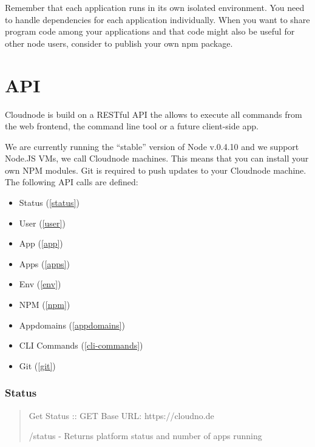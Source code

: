 Remember that each application runs in its own isolated environment. You need to handle dependencies for each application individually. When you want to share program code among your applications and that code might also be useful for other node users, consider to publish your own npm package.

\chapter{API}
\label{api}

Cloudnode is build on a RESTful API the allows to execute all commands from the web frontend, the command line tool or a future client-side app.

We are currently running the ``stable'' version of Node v.0.4.10 and we support Node.JS VMs, we call Cloudnode machines. This means that you can install your own NPM modules. Git is required to push updates to your Cloudnode machine. The following API calls are defined:

\begin{itemize}
\item Status (\autoref{status})

\item User (\autoref{user})

\item App (\autoref{app})

\item Apps (\autoref{apps})

\item Env (\autoref{env})

\item NPM (\autoref{npm})

\item Appdomains (\autoref{appdomains})

\item CLI Commands (\autoref{cli-commands})

\item Git (\autoref{git})

\end{itemize}



\subsection{Status}
\label{status}

\begin{quote}

Get Status :: GET
Base URL: https:/\slash cloudno.de

\slash status - Returns platform status and number of apps running
\end{quote}

